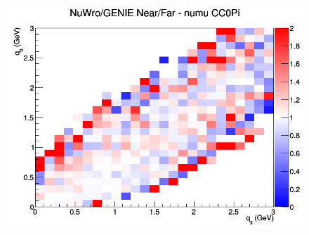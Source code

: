 \documentclass[12pt]{article}
\begin{document}
\begin{figure}[h]
\endminipage
{}
\includegraphics[width=\linewidth]{eff_q0_q3/LAr/ratios/CC0Pi_NuWro_GENIE_numu_NF_q3_q0.png}
\endminipage
\newline
\end{figure}
\clearpage
\end{document}
